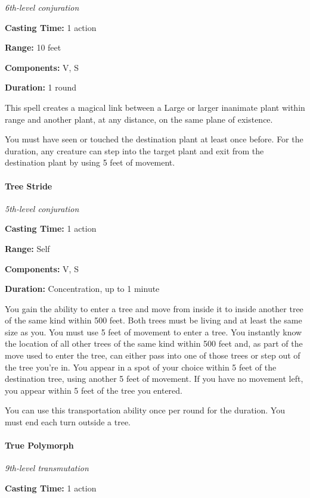 \documentclass[
]{article}
\begin{document}
\emph{6th-level conjuration}

\textbf{Casting Time:} 1 action

\textbf{Range:} 10 feet

\textbf{Components:} V, S

\textbf{Duration:} 1 round

This spell creates a magical link between a Large or larger inanimate
plant within range and another plant, at any distance, on the same plane
of existence.

You must have seen or touched the destination plant at least once
before. For the duration, any creature can step into the target plant
and exit from the destination plant by using 5 feet of movement.

\hypertarget{tree-stride}{%
\paragraph{Tree Stride}\label{tree-stride}}

\emph{5th-level conjuration}

\textbf{Casting Time:} 1 action

\textbf{Range:} Self

\textbf{Components:} V, S

\textbf{Duration:} Concentration, up to 1 minute

You gain the ability to enter a tree and move from inside it to inside
another tree of the same kind within 500 feet. Both trees must be living
and at least the same size as you. You must use 5 feet of movement to
enter a tree. You instantly know the location of all other trees of the
same kind within 500 feet and, as part of the move used to enter the
tree, can either pass into one of those trees or step out of the tree
you're in. You appear in a spot of your choice within 5 feet of the
destination tree, using another 5 feet of movement. If you have no
movement left, you appear within 5 feet of the tree you entered.

You can use this transportation ability once per round for the duration.
You must end each turn outside a tree.

\hypertarget{true-polymorph}{%
\paragraph{True Polymorph}\label{true-polymorph}}

\emph{9th-level transmutation}

\textbf{Casting Time:} 1 action
\end{document}
